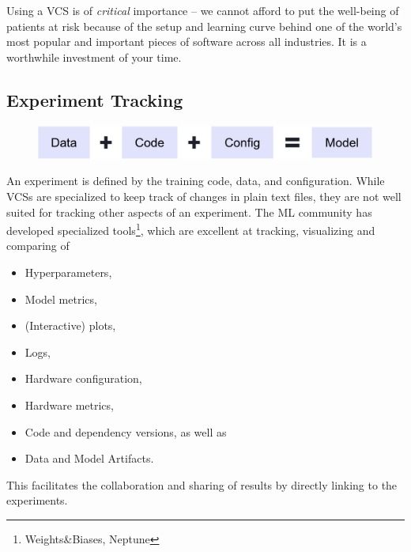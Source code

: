 Using a VCS is of \textit{critical} importance -- we cannot afford to put the well-being of patients at risk because of the setup and learning curve behind one of the world's most popular and important pieces of software across all industries. It is a worthwhile investment of your time.

\subsection{Experiment Tracking}
\label{sec:experiment_tracking}
\begin{figure}[h]
    \includegraphics[width=\linewidth]{chapters/NLP/figures/model.png}
    \label{fig:model}
\end{figure}
An experiment is defined by the training code, data, and configuration.
While VCSs are specialized to keep track of changes in plain text files, they are not well suited for tracking other aspects of an experiment.
The ML community has developed specialized tools\footnote{Weights\&Biases, Neptune}, which are excellent at tracking, visualizing and comparing of
\begin{itemize}
    \item Hyperparameters,
    \item Model metrics,
    \item (Interactive) plots,
    \item Logs,
    \item Hardware configuration,
    \item Hardware metrics,
    \item Code and dependency versions, as well as
    \item Data and Model Artifacts.
\end{itemize}
This facilitates the collaboration and sharing of results by directly linking to the experiments.

